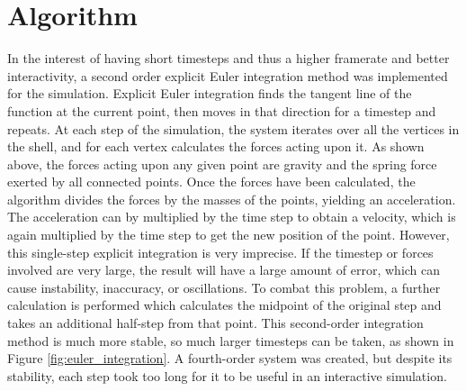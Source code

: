 \documentclass{thesis}
\begin{document}
\section{Algorithm}
In the interest of having short timesteps and thus a higher framerate and better interactivity, a second order explicit Euler integration
method was implemented for the simulation.  Explicit Euler integration finds the tangent line of the function at the current point, then
moves in that direction for a timestep and repeats.  
At each step of the simulation, the system iterates over all the vertices in the shell, and for each vertex calculates the forces acting
upon it.  As shown above, the forces acting upon any given point are gravity and the spring force exerted by all connected points.  Once
the forces have been calculated, the algorithm divides the forces by the masses of the points, yielding an acceleration.  The acceleration
can by multiplied by the time step to obtain a velocity, which is again multiplied by the time step to get the new position of the point.
However, this single-step explicit integration is very imprecise.  If the timestep or forces involved are very large, the result will
have a large amount of error, which can cause instability, inaccuracy, or oscillations.  To combat this problem, a further calculation
is performed which calculates the midpoint of the original step and takes an additional half-step from that point.  This second-order
integration method is much more stable, so much larger timesteps can be taken, as shown in Figure \ref{fig:euler_integration}.  A
fourth-order system was created, but despite its stability, each step took too long for it to be useful in an interactive simulation.
\end{document}
